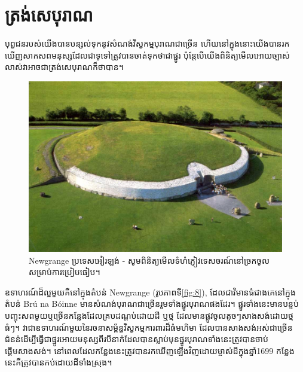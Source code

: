 \documentclass[10pt,twocolumn,letterpaper]{article}
\begin{document}
\section{ត្រង់សេបុរាណ}

បុព្វជនរបស់យើងបានបន្សល់ទុកនូវសំណង់វិស្វកម្មបុរាណជាច្រើន ហើយនៅក្នុងនោះយើងបានរកឃើញសាកសពមនុស្សដែលជាទូទៅត្រូវបានចាត់ទុកថាជាផ្នូរ ប៉ុន្តែបើយើងពិនិត្យមើលអោយច្បាស់លាស់វាអាចជាត្រង់សេបុរាណក៏ថាបាន។

\begin{figure}[b]
\begin{center}
   \includegraphics[width=1\linewidth]{ww19.jpg}
\end{center}
   \caption{Newgrange ប្រទេសអៀរឡង់ - សូមពិនិត្យមើលទំហំភ្ញៀវទេសចរណ៍នៅច្រកចូលសម្រាប់ការប្រៀបធៀប។}
\label{fig:8}
\label{fig:onecol}
\end{figure}

ឧទាហរណ៍ដ៏ល្អមួយគឺនៅក្នុងតំបន់ Newgrange (រូបភាពទី\ref{fig:8}), ដែលជាវិមានធំជាងគេនៅក្នុងតំបន់ Brú na Bóinne មានសំណង់បុរាណជាច្រើនរួមទាំងផ្នូរបុរាណផងដែរ។ ផ្នូរទាំងនេះមានបន្ទប់បញ្ចុះសពមួយឬច្រើនកន្លែងដែលគ្របដណ្តប់ដោយដី ឬថ្ម ដែលមានផ្លូវចូលតូចៗសាងសង់ដោយថ្មធំៗ\cite{70}។ វាជាឧទាហរណ៍មួយនៃរចនាសម្ព័ន្ធវិស្វកម្មការពារដ៏ធំមហិមា ដែលបានសាងសង់អស់ជាច្រើនជំនន់ដើម្បីធ្វើជាផ្នូរអោយមនុស្សពីរបីនាក់ដែលបានស្លាប់មុនផ្នូរបុរាណទាំងនេះត្រូវបានចាប់ផ្តើមសាងសង់។ នៅពេលដែលកន្លែងនេះត្រូវបានរកឃើញឡើងវិញដោយម្ចាស់ដីក្នុងឆ្នាំ1699 កន្លែងនេះគឺត្រូវបានកប់ដោយដីទាំងស្រុង។
\end{document}
